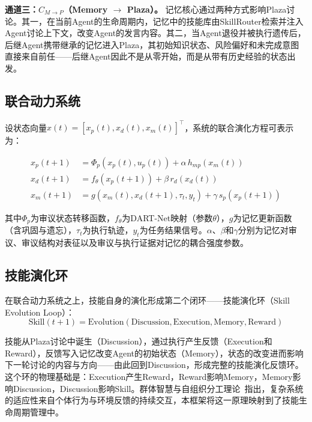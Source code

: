 \documentclass[12pt,a4paper]{ctexart}
\begin{document}
\textbf{通道三：$C_{M \to P}$（Memory $\to$ Plaza）。} 记忆核心通过两种方式影响Plaza讨论。其一，在当前Agent的生命周期内，记忆中的技能库由SkillRouter检索并注入Agent讨论上下文，改变Agent的发言内容。其二，当Agent退役并被执行遗传后，后继Agent携带继承的记忆进入Plaza，其初始知识状态、风险偏好和未完成意图直接来自前任——后继Agent因此不是从零开始，而是从带有历史经验的状态出发。

\subsection{联合动力系统}

设状态向量$x(t) = [x_p(t), x_d(t), x_m(t)]^{\top}$，系统的联合演化方程可表示为：

\begin{align}
x_p(t+1) &= \Phi_p(x_p(t), u_p(t)) + \alpha \, h_{mp}(x_m(t)) \label{eq:x_p} \\
x_d(t+1) &= f_{\theta}(x_p(t+1)) + \beta \, r_d(x_d(t)) \label{eq:x_d} \\
x_m(t+1) &= g(x_m(t), x_d(t+1), \tau_t, y_t) + \gamma \, s_p(x_p(t+1)) \label{eq:x_m}
\end{align}

其中$\Phi_p$为审议状态转移函数，$f_{\theta}$为DART-Net映射（参数$\theta$），$g$为记忆更新函数（含巩固与遗忘），$\tau_t$为执行轨迹，$y_t$为任务结果信号。$\alpha$、$\beta$和$\gamma$分别为记忆对审议、审议结构对表征以及审议与执行证据对记忆的耦合强度参数。

\subsection{技能演化环}

在联合动力系统之上，技能自身的演化形成第二个闭环——技能演化环（Skill Evolution Loop）：
\begin{equation}
\text{Skill}(t+1) = \text{Evolution}(\text{Discussion}, \text{Execution}, \text{Memory}, \text{Reward})
\label{eq:skill_evo}
\end{equation}

技能从Plaza讨论中诞生（Discussion），通过执行产生反馈（Execution和Reward），反馈写入记忆改变Agent的初始状态（Memory），状态的改变进而影响下一轮讨论的内容与方向——由此回到Discussion，形成完整的技能演化反馈环。这个环的物理基础是：Execution产生Reward，Reward影响Memory，Memory影响Discussion，Discussion影响Skill。群体智慧与自组织分工理论~\cite{bonabeau1999swarm,theraulaz1998modeling}指出，复杂系统的适应性来自个体行为与环境反馈的持续交互，本框架将这一原理映射到了技能生命周期管理中。
\end{document}
